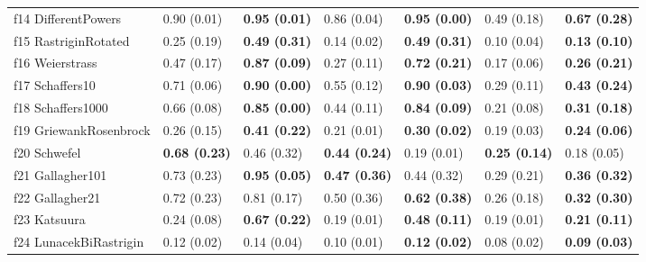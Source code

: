 \begin{table}
\begin{tabular}{lllllll}
f14 DifferentPowers & 0.90 (0.01) & \textbf{0.95 (0.01)} & 0.86 (0.04) & \textbf{0.95 (0.00)} & 0.49 (0.18) & \textbf{0.67 (0.28)} \\
f15 RastriginRotated & 0.25 (0.19) & \textbf{0.49 (0.31)} & 0.14 (0.02) & \textbf{0.49 (0.31)} & 0.10 (0.04) & \textbf{0.13 (0.10)} \\
f16 Weierstrass & 0.47 (0.17) & \textbf{0.87 (0.09)} & 0.27 (0.11) & \textbf{0.72 (0.21)} & 0.17 (0.06) & \textbf{0.26 (0.21)} \\
f17 Schaffers10 & 0.71 (0.06) & \textbf{0.90 (0.00)} & 0.55 (0.12) & \textbf{0.90 (0.03)} & 0.29 (0.11) & \textbf{0.43 (0.24)} \\
f18 Schaffers1000 & 0.66 (0.08) & \textbf{0.85 (0.00)} & 0.44 (0.11) & \textbf{0.84 (0.09)} & 0.21 (0.08) & \textbf{0.31 (0.18)} \\
f19 GriewankRosenbrock & 0.26 (0.15) & \textbf{0.41 (0.22)} & 0.21 (0.01) & \textbf{0.30 (0.02)} & 0.19 (0.03) & \textbf{0.24 (0.06)} \\
f20 Schwefel & \textbf{0.68 (0.23)} & 0.46 (0.32) & \textbf{0.44 (0.24)} & 0.19 (0.01) & \textbf{0.25 (0.14)} & 0.18 (0.05) \\
f21 Gallagher101 & 0.73 (0.23) & \textbf{0.95 (0.05)} & \textbf{0.47 (0.36)} & 0.44 (0.32) & 0.29 (0.21) & \textbf{0.36 (0.32)} \\
f22 Gallagher21 & 0.72 (0.23) & 0.81 (0.17) & 0.50 (0.36) & \textbf{0.62 (0.38)} & 0.26 (0.18) & \textbf{0.32 (0.30)} \\
f23 Katsuura & 0.24 (0.08) & \textbf{0.67 (0.22)} & 0.19 (0.01) & \textbf{0.48 (0.11)} & 0.19 (0.01) & \textbf{0.21 (0.11)} \\
f24 LunacekBiRastrigin & 0.12 (0.02) & 0.14 (0.04) & 0.10 (0.01) & \textbf{0.12 (0.02)} & 0.08 (0.02) & \textbf{0.09 (0.03)} \\
\bottomrule
\end{tabular}
\end{table}
